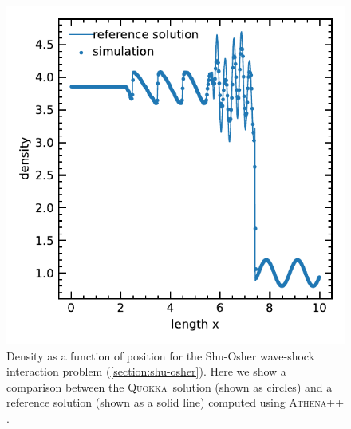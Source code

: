 \documentclass[fleqn,usenatbib]{mnras}
\newcommand{\quokka}{\textsc{Quokka}}
\begin{document}
\begin{figure}
    \includegraphics[width=\columnwidth]{hydro_shuosher.pdf}
    \caption{Density as a function of position for the Shu-Osher wave-shock interaction problem (\autoref{section:shu-osher}). Here we show a comparison between the \quokka~solution (shown as circles) and a reference solution (shown as a solid line) computed using \textsc{Athena++} \citep{Stone_2020}.}
    \label{fig:shu_osher}
\end{figure}
\end{document}
